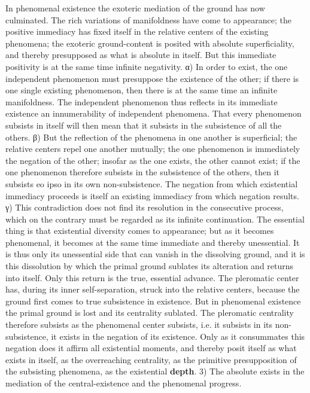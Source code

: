\documentclass[12pt,a4paper,openany]{book}
\newcommand{\opage}[1]{\marginnote{\footnotesize\textit{[#1]}}}
\begin{document}
In phenomenal existence the exoteric
mediation of the ground has now culminated. The rich
variations of manifoldness have come to appearance; the positive immediacy
has fixed itself in the relative
centers of the existing phenomena; the exoteric ground-content is posited with
absolute superficiality, and thereby presupposed as what is
absolute in itself. But this immediate positivity is at the same time
infinite negativity. α) In order to exist, the one
independent phenomenon must presuppose the existence of the other;
if there is one single existing phenomenon, then there is
at the same time an infinite manifoldness. The
independent phenomenon thus reflects in its immediate
existence an innumerability of independent phenomena.
That every phenomenon subsists in itself will then mean
that it subsists in the subsistence of all the others. β) But
the reflection of the phenomena in one another is superficial; the
relative centers repel one another mutually; the one
phenomenon is immediately the negation of the other; insofar as
the one exists, the other cannot exist; if
the one phenomenon therefore subsists in the subsistence of the others, then it subsists
eo ipso in its own non-subsistence. The negation
from which existential immediacy proceeds
is itself an existing immediacy from which negation
results. γ) This contradiction does not find its resolution
in the consecutive process, which on the contrary must be regarded
as its infinite continuation. The essential thing
is that existential diversity comes to appearance;
but as it becomes phenomenal, it becomes at the same time
immediate and thereby unessential. It is thus only
its unessential side that can vanish in the dissolving
ground, and it is this dissolution by which the
\setcounter{footnote}{0}%
\opage{164}primal ground sublates its alteration and returns into
itself. Only this return is the true,
essential advance. The pleromatic center has,
during its inner self-separation, struck into the relative
centers, because the ground first comes to true subsistence
in existence. But in phenomenal existence
the primal ground is lost and its centrality sublated. The
pleromatic centrality therefore subsists as the phenomenal
center subsists, i.e. it subsists in its non-subsistence,
it exists in the negation of its existence.
Only as it consummates this negation does it affirm
all existential moments, and thereby posit itself
as what exists in itself, as the overreaching
centrality, as the primitive presupposition of the subsisting phenomena,
as the existential \textbf{depth}.
3) The absolute exists in the mediation of the central-existence and the phenomenal progress.
\end{document}
